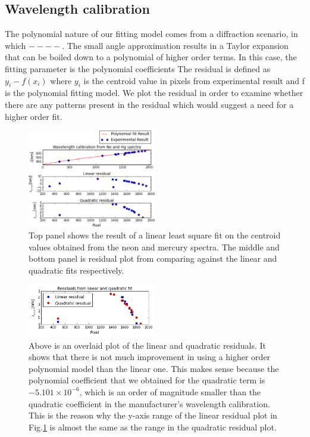 \documentclass[authoryear, 12pt,5p, times]{elsarticle}
\begin{document}
\subsection{Wavelength calibration}
The polynomial nature of our fitting model comes from a diffraction scenario, in which $----$. The  small angle approximation results in a Taylor expansion that can be boiled down to a polynomial of higher order terms. In this case, the fitting parameter is the polynomial coefficients The residual is defined as $y_i-f(x_i)$ where $y_i$ is the centroid value in pixels from experimental result and f is the polynomial fitting model.  We plot the residual in order to examine whether  there are any patterns present in the residual which would suggest a need for a higher order fit.
\begin{figure}
\includegraphics[width=0.5\textwidth]{figures/neon_calib}
\caption{Top panel shows the result of a linear least square fit on the centroid values obtained from the neon and mercury spectra. The middle and bottom panel is residual plot from comparing against the linear and quadratic fits respectively.}\label{neon_calib}
\end{figure}
\begin{figure}
\label{comp_linquad}
\includegraphics[width=0.5\textwidth]{figures/compare_linquad}
\caption{Above is an overlaid plot of the linear and quadratic residuals. It shows that there is not much improvement in using a higher order polynomial model than the linear one. This makes sense because the polynomial coefficient that we obtained for the quadratic term is $-5.101\times 10^{-6}$, which is an order of magnitude smaller than the quadratic coefficient in the manufacturer's wavelength calibration. This is the reason why the y-axis range of the linear residual plot in Fig.\ref{neon_calib} is almost the same as the range in the quadratic residual plot.} 
\end{figure}
\end{document}
